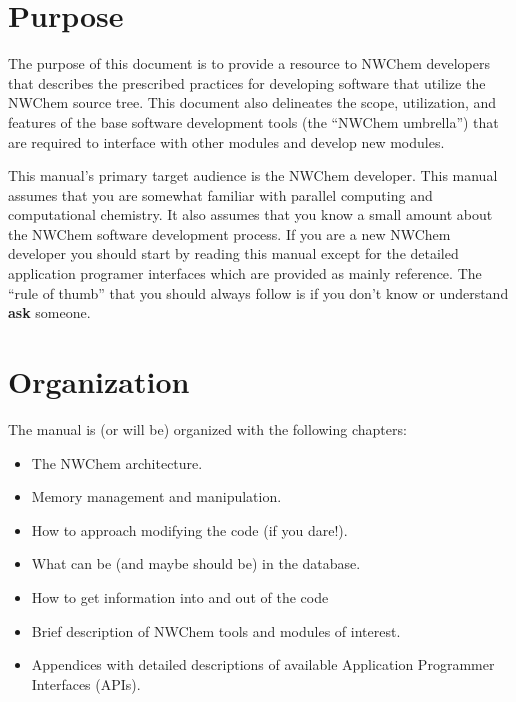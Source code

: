 \section{Purpose}

The purpose of this document is to provide a resource to NWChem
developers that describes the prescribed practices for developing
software that utilize the NWChem source tree.  This document also
delineates the scope, utilization, and features of the base software
development tools (the ``NWChem umbrella'') that are required to
interface with other modules and develop new modules.  

This manual's primary target audience is the NWChem developer.  This
manual assumes that you are somewhat familiar with parallel computing
and computational chemistry.  It also assumes that you know a small
amount about the NWChem software development process.  If you are a
new NWChem developer you should start by reading this manual except
for the detailed application programer interfaces which are provided
as mainly reference.  The ``rule of thumb'' that you should always
follow is if you don't know or understand {\bf ask} someone.  

\section{Organization}

The manual is (or will be) organized with the following chapters:
\begin{itemize}
\item The NWChem architecture. 
\item Memory management and manipulation.
\item How to approach modifying the code (if you dare!).
\item What can be (and maybe should be) in the database.
\item How to get information into and out of the code
\item Brief description of NWChem tools and modules of interest.
\item Appendices with detailed descriptions of available Application
  Programmer Interfaces (APIs).
\end{itemize}

